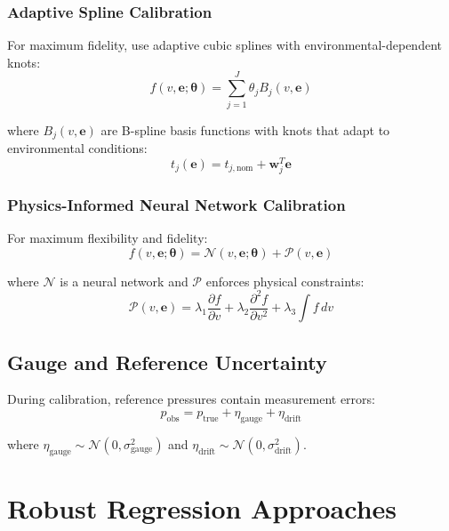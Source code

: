 \documentclass[11pt]{article}
\begin{document}
\subsubsection{Adaptive Spline Calibration}
For maximum fidelity, use adaptive cubic splines with environmental-dependent knots:
\begin{equation}
f(v, \mathbf{e}; \bm{\theta}) = \sum_{j=1}^{J} \theta_j B_j(v, \mathbf{e})
\end{equation}

where $B_j(v, \mathbf{e})$ are B-spline basis functions with knots that adapt to environmental conditions:
\begin{equation}
t_j(\mathbf{e}) = t_{j,\text{nom}} + \mathbf{w}_j^T \mathbf{e}
\end{equation}

\subsubsection{Physics-Informed Neural Network Calibration}
For maximum flexibility and fidelity:
\begin{equation}
f(v, \mathbf{e}; \bm{\theta}) = \mathcal{N}(v, \mathbf{e}; \bm{\theta}) + \mathcal{P}(v, \mathbf{e})
\end{equation}

where $\mathcal{N}$ is a neural network and $\mathcal{P}$ enforces physical constraints:
\begin{equation}
\mathcal{P}(v, \mathbf{e}) = \lambda_1 \frac{\partial f}{\partial v} + \lambda_2 \frac{\partial^2 f}{\partial v^2} + \lambda_3 \int f \, dv
\end{equation}

\subsection{Gauge and Reference Uncertainty}

During calibration, reference pressures contain measurement errors:
\begin{equation}
p_{\text{obs}} = p_{\text{true}} + \eta_{\text{gauge}} + \eta_{\text{drift}}
\end{equation}

where $\eta_{\text{gauge}} \sim \mathcal{N}(0, \sigma_{\text{gauge}}^2)$ and $\eta_{\text{drift}} \sim \mathcal{N}(0, \sigma_{\text{drift}}^2)$.

\section{Robust Regression Approaches}
\end{document}

